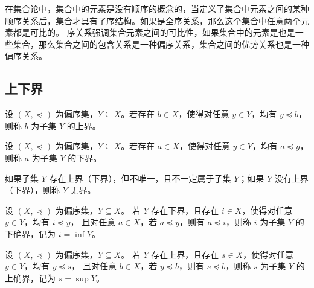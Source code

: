 \vspace{1em}

\begin{note}
    在集合论中，集合中的元素是没有顺序的概念的，当定义了集合中元素之间的某种顺序关系后，集合才具有了序结构。如果是全序关系，那么这个集合中任意两个元素都是可比的。
    序关系强调集合元素之间的可比性，如果集合中的元素是也是一些集合，那么集合之间的包含关系是一种偏序关系，集合之间的优势关系也是一种偏序关系。
\end{note}
\vspace{1em}

\subsection{上下界}

\begin{definition}
    设 $ (X,\preceq) $ 为偏序集，$ Y\subseteq X $。若存在 $ b\in X $，使得对任意 $ y\in Y $，均有 $ y\preceq b $，则称 $ b $ 为子集 $ Y $ 的上界。
\end{definition}

\begin{definition}
    设 $ (X,\preceq) $ 为偏序集，$ Y\subseteq X $。若存在 $ a\in X $，使得对任意 $ y\in Y $，均有 $ a\preceq y $，则称 $ a $ 为子集 $ Y $ 的下界。
\end{definition}

\begin{note}
    如果子集 $Y$ 存在上界（下界），但不唯一，且不一定属于子集 $ Y $；如果 $ Y $  没有上界（下界），则称 $ Y $ 无界。
\end{note}
\vspace{1em}

\begin{definition}
    设 $ (X,\preceq) $ 为偏序集，$ Y\subseteq X $。
    若 $ Y $ 存在下界，且存在 $ i\in X $，使得对任意 $ y\in Y $，均有 $ i\preceq y $，
    且对任意 $ a\in X $，若 $ a\preceq y $，则有 $ a\preceq i $，则称 $ i $ 为子集 $ Y $ 的下确界，记为 $ i=\inf Y $。
\end{definition}

\begin{definition}
    设 $ (X,\preceq) $ 为偏序集，$ Y\subseteq X $。
    若 $ Y $ 存在上界，且存在 $ s\in X $，使得对任意 $ y\in Y $，均有 $ y\preceq s $，
    且对任意 $ b\in X $，若 $ y\preceq b $，则有 $ s\preceq b $，则称 $ s $ 为子集 $ Y $ 的上确界，记为 $ s=\sup Y $。
\end{definition}

